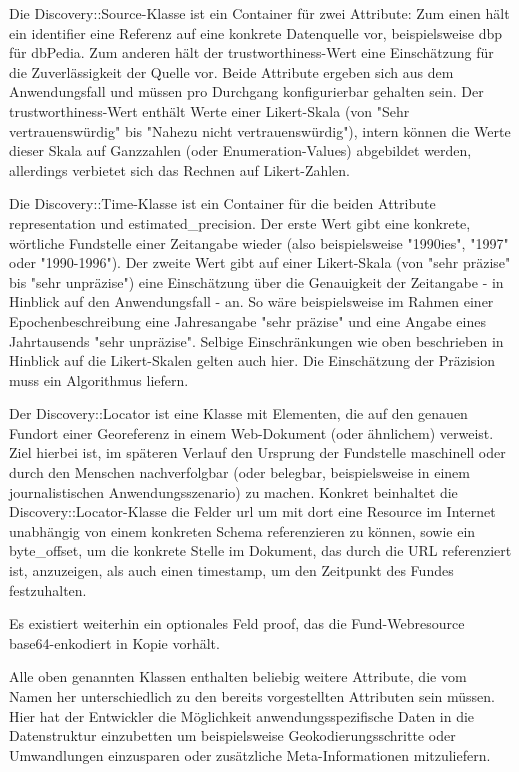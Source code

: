 Die Discovery::Source-Klasse ist ein Container für zwei Attribute: Zum einen hält ein identifier eine Referenz auf eine konkrete Datenquelle vor, beispielsweise dbp für dbPedia. Zum anderen hält der trustworthiness-Wert eine Einschätzung für die Zuverlässigkeit der Quelle vor. Beide Attribute ergeben sich aus dem Anwendungsfall und müssen pro Durchgang konfigurierbar gehalten sein. Der trustworthiness-Wert enthält Werte einer Likert-Skala (von "Sehr vertrauenswürdig" bis "Nahezu nicht vertrauenswürdig"), intern können die Werte dieser Skala auf Ganzzahlen (oder Enumeration-Values) abgebildet werden, allerdings verbietet sich das Rechnen auf Likert-Zahlen.

Die Discovery::Time-Klasse ist ein Container für die beiden Attribute representation und estimated\_precision. Der erste Wert gibt eine konkrete, wörtliche Fundstelle einer Zeitangabe wieder (also beispielsweise "1990ies", "1997" oder "1990-1996"). Der zweite Wert gibt auf einer Likert-Skala (von "sehr präzise" bis "sehr unpräzise") eine Einschätzung über die Genauigkeit der Zeitangabe - in Hinblick auf den Anwendungsfall - an. So wäre beispielsweise im Rahmen einer Epochenbeschreibung eine Jahresangabe "sehr präzise" und eine Angabe eines Jahrtausends "sehr unpräzise". Selbige Einschränkungen wie oben beschrieben in Hinblick auf die Likert-Skalen gelten auch hier. Die Einschätzung der Präzision muss ein Algorithmus liefern.

Der Discovery::Locator ist eine Klasse mit Elementen, die auf den genauen Fundort einer Georeferenz in einem Web-Dokument (oder ähnlichem) verweist. Ziel hierbei ist, im späteren Verlauf den Ursprung der Fundstelle maschinell oder durch den Menschen nachverfolgbar (oder belegbar, beispielsweise in einem journalistischen Anwendungsszenario) zu machen. Konkret beinhaltet die Discovery::Locator-Klasse die Felder url um mit dort eine Resource im Internet unabhängig von einem konkreten Schema referenzieren zu können, sowie ein byte\_offset, um die konkrete Stelle im Dokument, das durch die URL referenziert ist, anzuzeigen, als auch einen timestamp, um den Zeitpunkt des Fundes festzuhalten.
  
Es existiert weiterhin ein optionales Feld proof, das die Fund-Webresource base64-enkodiert in Kopie vorhält.

Alle oben genannten Klassen enthalten beliebig weitere Attribute, die vom Namen her unterschiedlich zu den bereits vorgestellten Attributen sein müssen. Hier hat der Entwickler die Möglichkeit anwendungsspezifische Daten in die Datenstruktur einzubetten um beispielsweise Geokodierungsschritte oder Umwandlungen einzusparen oder zusätzliche Meta-Informationen mitzuliefern.

